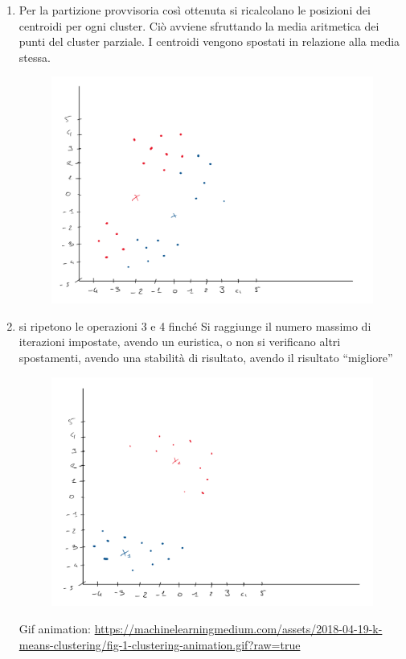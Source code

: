 \begin{enumerate}
  \item Per la partizione provvisoria così ottenuta si ricalcolano le posizioni dei centroidi per ogni cluster. Ciò avviene sfruttando la media aritmetica dei punti del cluster parziale. I centroidi vengono spostati in relazione alla media stessa.
  \begin{figure}[H]
    \centering
    \includegraphics[width=1\textwidth]{img/kmeans3.PNG}
\end{figure}
  \item si ripetono le operazioni 3 e 4 finché Si raggiunge il numero massimo di
  iterazioni impostate, avendo un euristica, o non si verificano altri
  spostamenti, avendo una stabilità di risultato, avendo il risultato
  ``migliore'' 
      \begin{figure}[H]
    \centering
    \includegraphics[width=1\textwidth]{img/kmeans4.PNG}
\end{figure}
\begin{nota}
Gif animation: \url{https://machinelearningmedium.com/assets/2018-04-19-k-means-clustering/fig-1-clustering-animation.gif?raw=true}
\end{nota}
\end{enumerate}

